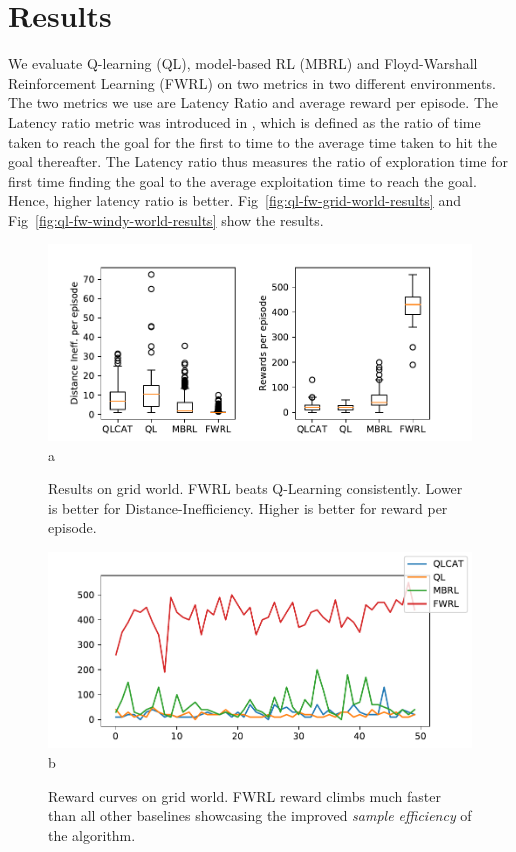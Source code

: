\section{Results}

We evaluate Q-learning (QL), model-based RL (MBRL) and Floyd-Warshall
Reinforcement Learning (FWRL) on two metrics in two different environments. The
two metrics we use are Latency Ratio and average reward per episode. The Latency
ratio metric was introduced in \citet{MiPaViICLR2017}, which is defined as the
ratio of time taken to reach the goal for the first to time to the average time
taken to hit the goal thereafter. The Latency ratio thus measures the ratio of
exploration time for first time finding the goal to the average exploitation
time to reach the goal. Hence, higher latency ratio is better.
Fig~\ref{fig:ql-fw-grid-world-results} and
Fig~\ref{fig:ql-fw-windy-world-results} show the results.

\begin{figure}%
    \begin{minipage}{\columnwidth}
        \includegraphics[width=\columnwidth]{./media/metrics-grid-world.pdf}{a}
        \caption{Results on grid world. FWRL beats Q-Learning
        consistently. Lower is better for Distance-Inefficiency. Higher
        is better for reward per episode. }
      \label{fig:ql-fw-grid-world-results}%
    \end{minipage}
    \begin{minipage}{\columnwidth}
        \includegraphics[width=\columnwidth]{./media/rewards-metrics-grid-world.pdf}{b}
        \caption{Reward curves on grid world. FWRL reward climbs much
        faster than all other baselines showcasing the improved \emph{sample
        efficiency} of the algorithm.}
      \label{fig:ql-fw-grid-world-reward-curves}%
    \end{minipage}
\end{figure}


